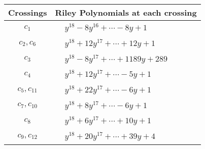 \documentclass[1p]{elsarticle_modified}
\theoremstyle{definition}
\begin{document}
\begin{tabular}{m{50pt}|m{274pt}}
Crossings & \hspace{64pt}Riley Polynomials at each crossing \\
\hline $$\begin{aligned}c_{1}\end{aligned}$$&$\begin{aligned}
&y^{18}-8 y^{16}+\cdots-8 y+1
\end{aligned}$\\
\hline $$\begin{aligned}c_{2},c_{6}\end{aligned}$$&$\begin{aligned}
&y^{18}+12 y^{17}+\cdots+12 y+1
\end{aligned}$\\
\hline $$\begin{aligned}c_{3}\end{aligned}$$&$\begin{aligned}
&y^{18}-8 y^{17}+\cdots+1189 y+289
\end{aligned}$\\
\hline $$\begin{aligned}c_{4}\end{aligned}$$&$\begin{aligned}
&y^{18}+12 y^{17}+\cdots-5 y+1
\end{aligned}$\\
\hline $$\begin{aligned}c_{5},c_{11}\end{aligned}$$&$\begin{aligned}
&y^{18}+22 y^{17}+\cdots-6 y+1
\end{aligned}$\\
\hline $$\begin{aligned}c_{7},c_{10}\end{aligned}$$&$\begin{aligned}
&y^{18}+8 y^{17}+\cdots-6 y+1
\end{aligned}$\\
\hline $$\begin{aligned}c_{8}\end{aligned}$$&$\begin{aligned}
&y^{18}+6 y^{17}+\cdots+10 y+1
\end{aligned}$\\
\hline $$\begin{aligned}c_{9},c_{12}\end{aligned}$$&$\begin{aligned}
&y^{18}+20 y^{17}+\cdots+39 y+4
\end{aligned}$\\
\hline
\end{tabular}\\~\\
\end{document}
